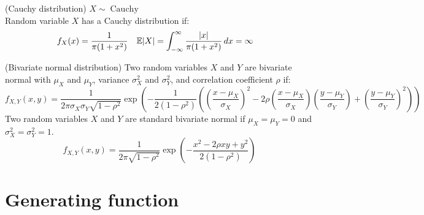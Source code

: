 \documentclass{huhtakm-template-book}
\newcommand{\expect}{\mathbb{E}}
\DeclareMathOperator{\Cauchy}{Cauchy}
\begin{document}
    \begin{seg}(Cauchy distribution) $X\sim\Cauchy$\\
        Random variable $X$ has a Cauchy distribution if:
        \begin{align*}
            f_{X}(x)&=\frac{1}{\pi(1+x^{2})} & \expect|X|&=\intinfty\frac{|x|}{\pi(1+x^{2})}\,dx=\infty
        \end{align*}
    \end{seg}
    \begin{seg}(Bivariate normal distribution)
        Two random variables $X$ and $Y$ are bivariate normal with $\mu_{X}$ and $\mu_{Y}$, variance $\sigma_{X}^{2}$ and $\sigma_{Y}^{2}$, and correlation coefficient $\rho$ if:
        \begin{equation*}
        f_{X,Y}(x,y)=\frac{1}{2\pi\sigma_{X}\sigma_{Y}\sqrt{1-\rho^{2}}}\exp\left(-\frac{1}{2(1-\rho^{2})}\left(\left(\frac{x-\mu_{X}}{\sigma_{X}}\right)^{2}-2\rho\left(\frac{x-\mu_{X}}{\sigma_{X}}\right)\left(\frac{y-\mu_{Y}}{\sigma_{Y}}\right)+\left(\frac{y-\mu_{Y}}{\sigma_{Y}}\right)^{2}\right)\right)
        \end{equation*}
        Two random variables $X$ and $Y$ are standard bivariate normal if $\mu_{X}=\mu_{Y}=0$ and $\sigma_{X}^{2}=\sigma_{Y}^{2}=1$.
        \begin{equation*}
            f_{X,Y}(x,y)=\frac{1}{2\pi\sqrt{1-\rho^{2}}}\exp\left(-\frac{x^{2}-2\rho xy+y^{2}}{2(1-\rho^{2})}\right)
        \end{equation*}
    \end{seg}

\chapter{Generating function}
\end{document}
